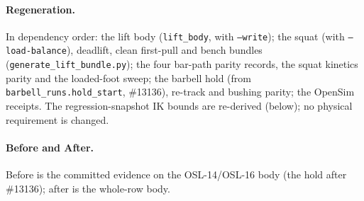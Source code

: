 \documentclass[11pt,a4paper]{article}
\begin{document}
\paragraph{Regeneration.} In dependency order: the lift body
(\texttt{lift\_body}, with \texttt{--write}); the squat (with
\texttt{--load-balance}), deadlift, clean first-pull and bench bundles
(\texttt{generate\_lift\_bundle.py}); the
four bar-path parity records, the squat kinetics parity and the loaded-foot
sweep; the barbell hold (from \texttt{barbell\_runs.hold\_start}, \#13136),
re-track and bushing parity; the OpenSim receipts. The regression-snapshot IK
bounds are re-derived (below); no physical requirement is changed.

\paragraph{Before and After.} Before is the committed evidence on the
OSL-14/OSL-16 body (the hold after \#13136); after is the whole-row body.
\end{document}
